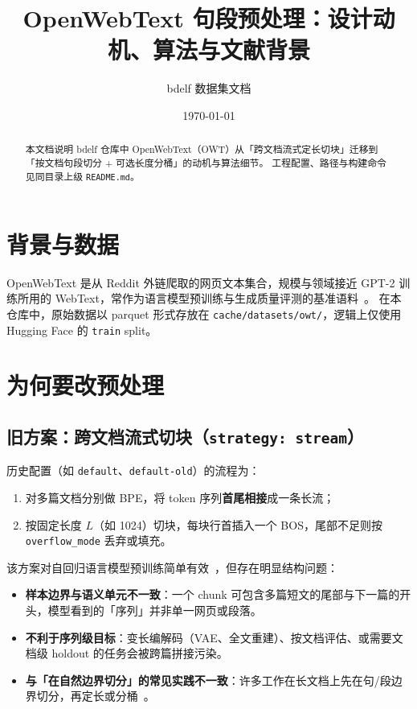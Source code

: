\documentclass[UTF8,a4paper,11pt]{ctexart}
\title{OpenWebText 句段预处理：设计动机、算法与文献背景}
\author{bdelf 数据集文档}
\date{\today}
\begin{document}
\maketitle

\begin{abstract}
本文档说明 bdelf 仓库中 OpenWebText（OWT）从「跨文档流式定长切块」迁移到「按文档句段切分 + 可选长度分桶」的动机与算法细节。
工程配置、路径与构建命令见同目录上级 \texttt{README.md}。
\end{abstract}

\section{背景与数据}

OpenWebText 是从 Reddit 外链爬取的网页文本集合，规模与领域接近 GPT-2 训练所用的 WebText，常作为语言模型预训练与生成质量评测的基准语料~\cite{openwebtext,radford2019language}。
在本仓库中，原始数据以 parquet 形式存放在 \texttt{cache/datasets/owt/}，逻辑上仅使用 Hugging Face 的 \texttt{train} split。

\section{为何要改预处理}

\subsection{旧方案：跨文档流式切块（\texttt{strategy: stream}）}

历史配置（如 \texttt{default}、\texttt{default-old}）的流程为：
\begin{enumerate}
  \item 对多篇文档分别做 BPE，将 token 序列\textbf{首尾相接}成一条长流；
  \item 按固定长度 $L$（如 1024）切块，每块行首插入一个 BOS，尾部不足则按 \texttt{overflow\_mode} 丢弃或填充。
\end{enumerate}

该方案对自回归语言模型预训练简单有效~\cite{radford2019language}，但存在明显结构问题：
\begin{itemize}
  \item \textbf{样本边界与语义单元不一致}：一个 chunk 可包含多篇短文的尾部与下一篇的开头，模型看到的「序列」并非单一网页或段落。
  \item \textbf{不利于序列级目标}：变长编解码（VAE、全文重建）、按文档评估、或需要文档级 holdout 的任务会被跨篇拼接污染。
  \item \textbf{与「在自然边界切分」的常见实践不一致}：许多工作在长文档上先在句/段边界切分，再定长或分桶~\cite{raffel2020t5}。
\end{itemize}
\end{document}

